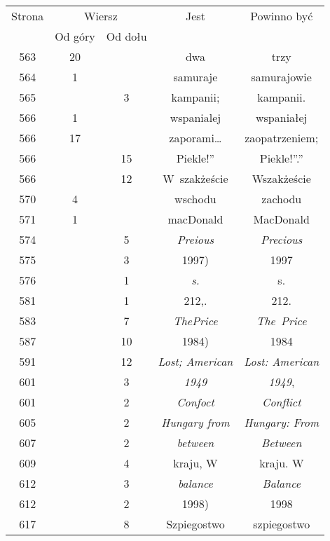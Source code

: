 \documentclass[a4paper,11pt]{article}
\numberwithin{equation}{section}
\begin{document}
\begin{center}
  \newpage

  \begin{tabular}{|c|c|c|c|c|}
    \hline
    Strona & \multicolumn{2}{c|}{Wiersz} & Jest
                              & Powinno być \\ \cline{2-3}
    & Od góry & Od dołu & & \\
    \hline
    563 & 20 & & dwa & trzy \\
    564 & \hphantom{0}1 & & samuraje & samurajowie \\
    565 & & \hphantom{0}3 & kampanii; & kampanii. \\
    566 & \hphantom{0}1 & & wspanialej & wspaniałej \\
    566 & 17 & & zaporami\ldots & zaopatrzeniem; \\
    566 & & 15 & Piekle!” & Piekle!”.” \\
    566 & & 12 & W~szakżeście& Wszakżeście \\
    570 & \hphantom{0}4 & & wschodu & zachodu \\
    571 & \hphantom{0}1 & & macDonald & MacDonald \\
    574 & & \hphantom{0}5 & \textit{Preious} & \textit{Precious} \\
    575 & & \hphantom{0}3 & 1997) & 1997 \\
    576 & & \hphantom{0}1 & \textit{s.} & s. \\
    581 & & \hphantom{0}1 & 212,. & 212. \\
    583 & & \hphantom{0}7 & \textit{ThePrice} & \textit{The~Price} \\
    587 & & 10 & 1984) & 1984 \\
    591 & & 12 & \textit{Lost; American} & \textit{Lost: American} \\
    601 & & \hphantom{0}3 & \textit{1949} & \textit{1949}, \\
    601 & & \hphantom{0}2 & \textit{Confoct} & \textit{Conflict} \\
    605 & & \hphantom{0}2 & \textit{Hungary from}
    & \textit{Hungary: From} \\
    607 & & \hphantom{0}2 & \textit{between} & \textit{Between} \\
    609 & & \hphantom{0}4 & kraju, W & kraju. W \\
    612 & & \hphantom{0}3 & \textit{balance} & \textit{Balance} \\
    612 & & \hphantom{0}2 & 1998) & 1998 \\
    617 & & \hphantom{0}8 & Szpiegostwo & szpiegostwo \\

\end{tabular}
\end{center}
\end{document}
